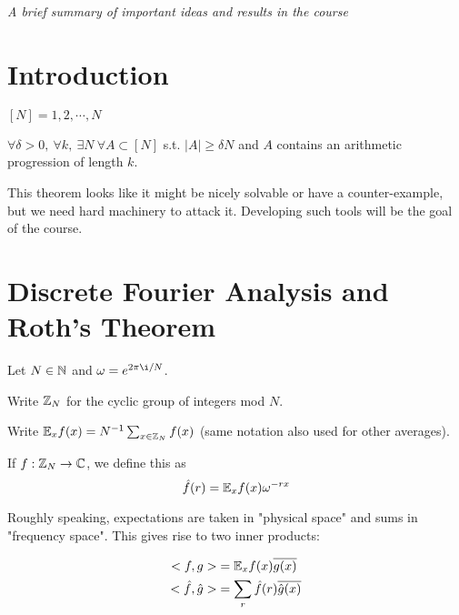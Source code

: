 \documentclass[a4paper]{article}
\begin{document}
\maketitle
{\small \centering
\noindent\emph{A brief summary of important ideas and results in the course}

\setcounter{section}{-1}
\section{Introduction}
\begin{notation}
$[N] = {1,2,\cdots, N}$
\end{notation}


\begin{thm}
	$\forall\delta > 0,\ \forall k,\ \exists N\ \forall A \subset [N]$ s.t. $|A| \geq\delta N$ and $A$ contains an arithmetic progression of length $k$.
\end{thm}

This theorem looks like it might be nicely solvable or have a counter-example, but we need hard machinery to attack it. Developing such tools will be the goal of the course.

\section{Discrete Fourier Analysis and Roth's Theorem}
\begin{notation}
Let $N\in\mathbb{N}$ and $\omega=e^{2\pi\i/N}$.

Write $\mathbb{Z}_N$ for the cyclic group of integers mod $N$.

Write $\mathbb{E}_xf(x)=N^{-1}\sum_{x\in\mathbb{Z}_N}f(x)$ (same notation also used for other averages).
\end{notation}

\begin{defi}
	If $f:\mathbb{Z}_N \rightarrow \mathbb{C}$, we define this as
	$$\hat{f}(r) = \mathbb{E}_xf(x)\omega^{-rx}$$
\end{defi}

Roughly speaking, expectations are taken in "physical space" and sums in "frequency space". This gives rise to two inner products:

\begin{align*}
	<f,g> &= \mathbb{E}_xf(x)\overline{g(x)}\\
	<\hat{f},\hat{g}> &= \sum_{r} \hat{f}(r)\overline{\hat{g}(x)}
\end{align*}

}
\end{document}
